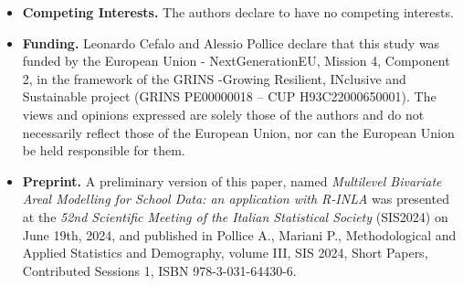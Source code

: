 \documentclass{book}
\begin{document}
\begin{itemize}
\item \textbf{Competing Interests.} The authors declare to have no competing interests. \\


\item \textbf{Funding.} Leonardo Cefalo and Alessio Pollice declare that this study was funded by the European Union - NextGenerationEU, Mission 4, Component 2, in the framework of the GRINS -Growing Resilient, INclusive and Sustainable project (GRINS PE00000018 – CUP H93C22000650001). The views and opinions expressed are solely those of the authors and do not necessarily reflect those of the European Union, nor can the European Union be held responsible for them. \\

\item \textbf{Preprint.} A preliminary version of this paper, named \textit{Multilevel Bivariate Areal Modelling for School Data: an application with R-INLA} was presented at the \textit{52nd Scientific Meeting of the Italian Statistical Society} (SIS2024) on June 19th, 2024, and published in Pollice A., Mariani P., Methodological and Applied Statistics and Demography, volume III, SIS 2024, Short Papers, Contributed Sessions 1, ISBN 978-3-031-64430-6.
\end{itemize}






%
%

%
%
%
\end{document}
